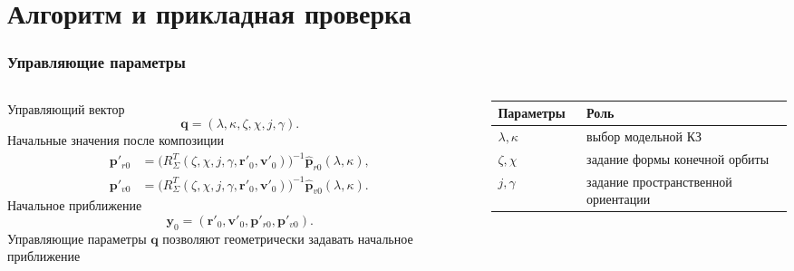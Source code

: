 \section{Алгоритм и прикладная проверка}
\begin{frame}[t]
    \frametitle{Управляющие параметры}
    \presentationtextsize
    \begin{columns}[T,onlytextwidth]
        \begin{column}{0.45\textwidth}
            Управляющий вектор
            \[
            \boldsymbol q =
            \left(
            \lambda,\kappa,\zeta,\chi,j,\gamma
            \right).
            \]
            Начальные значения после композиции
            \[
            \begin{aligned}
            \mathbf p'_{r0}
            &=
            \bigl(R_{\Sigma}^{T}(\zeta,\chi,j,\gamma,\mathbf r'_0,\mathbf v'_0)\bigr)^{-1}
            \widehat{\mathbf p}_{r0}(\lambda,\kappa),\\
            \mathbf p'_{v0}
            &=
            \bigl(R_{\Sigma}^{T}(\zeta,\chi,j,\gamma,\mathbf r'_0,\mathbf v'_0)\bigr)^{-1}
            \widehat{\mathbf p}_{v0}(\lambda,\kappa).
            \end{aligned}
            \]
            Начальное приближение
            \[
            \mathbf y_0
            =
            \left(
            \mathbf r'_0,
            \mathbf v'_0,
            \mathbf p'_{r0},
            \mathbf p'_{v0}
            \right).
            \]
            Управляющие параметры \(\mathbf q\) позволяют геометрически задавать начальное приближение
        \end{column}
        \begin{column}{0.51\textwidth}
            \setlength{\tabcolsep}{2.6pt}
            \renewcommand{\arraystretch}{1.08}

            \begin{tabular}{@{}
                >{\raggedright\arraybackslash}p{0.30\linewidth}
                >{\raggedright\arraybackslash}p{0.70\linewidth}
                @{}}
                \toprule
                Параметры & Роль \\
                \midrule
                \(\lambda,\kappa\) & выбор модельной КЗ \\
                \(\zeta,\chi\) & задание формы конечной орбиты \\
                \(j,\gamma\) & задание пространственной ориентации \\
                \bottomrule
            \end{tabular}
        \end{column}
    \end{columns}
\end{frame}
